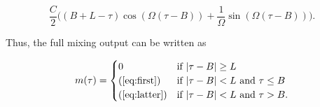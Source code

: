 \begin{appendices}
\begin{equation}\label{eq:latter}
	\frac{C}{2}\Big( (B + L - \tau)\cos(\Omega(\tau - B))
	+ \frac{1}{\Omega}\sin(\Omega(\tau - B))\Big).
\end{equation}

Thus, the full mixing output can be written as

\begin{equation}
	m(\tau) = \begin{cases}
		0 & \text{if $|\tau-B|\geq L$} \\
		\text{(\ref{eq:first})} & \text{if $|\tau-B| < L$ and $\tau \leq B$} \\
		\text{(\ref{eq:latter})} & \text{if $|\tau-B| < L$ and $\tau>B$}.
	\end{cases}
\end{equation}

\end{appendices}


